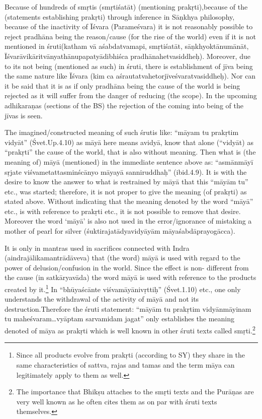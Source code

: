 Because of hundreds of smṛtis (smṛtiśatāt) (mentioning prakṛti),\break because of the (statements establishing prakṛti) through inference in Sāṇkhya philosophy, because of the inactivity of Īśvara (Parameśvara) it is not reasonably possible to reject pradhāna being the reason/cause (for the rise of the world) even if it is not mentioned in śruti(katham vā aśabdatvamapi, smṛtiśatāt, sāṇkhyoktānumānāt, Īśvarāvikāritvānya\-thānupapatyādibhiśca pradhānahetvasiddheḥ). Moreover, due to its not being (mentioned as such) in śruti, there is establishment of jīva being the same nature like Īśvara (kim ca aśrautatvahetorjīveśvaratvasiddheḥ). Nor can it be said that it is as if only pradhāna being the cause of the world is being rejected as it will suffer from the danger of reducing (the scope). In the upcoming adhikaraṇas (sections of the BS) the rejection of the coming into being of the jīvas is seen.

\vskip 5pt

The imagined/constructed meaning of such śrutis like: “māyam tu prakṛtim vidyāt” (Śvet.Up.4.10)  as māyā here means avidyā, know that alone (“vidyāt) as “prakṛti” the cause of the world, that is also without meaning. Then what is (the meaning of) māyā (mentioned) in the immediate sentence above as: “asmānmāyī sṛjate viśvametattasminścānyo māyayā sanniruddhaḥ” (ibid.4.9). It is with the desire to know the answer to what is restrained by māyā that this “māyām tu” etc., was started; therefore, it is not proper to give the meaning (of prakṛti) as stated above. Without indicating that the meaning denoted by the word “māyā” etc., is with reference to prakṛti etc., it is not possible to remove that desire. Moreover the word ‘māyā’ is also not used in the error/ignorance of mistaking a mother of pearl for silver (śuktirajatādyavidyāyām māyaśabdāprayogācca).

\vskip 5pt

It is only in mantras used in sacrifices connected with Indra (aindrajālikamantrādāveva) that (the word) māyā is used with regard to the power of delusion/confusion in the world. Since the effect is non- different from the cause (in satkāryavāda) the word māyā is used with reference to the products created by it.\footnote{Since all products evolve from prakṛti (according to SY) they share in the same characteristics of sattva, rajas and tamas and the  term māya can legitimately apply to them as well.} In “bhūyaścānte viśvamāyānivṛttiḥ” (Śvet.1.10) etc., one only understands the withdrawal of the activity of māyā and not its destruction.Therefore the śruti statement: “māyām tu prakṛtim vidyānmāyinam tu maheśvaram…vyāptam sarvamidam jagat” only establishes the meaning denoted of māya as prakṛti which is well known in other śruti texts called smṛti.\footnote{The importance that Bhikṣu attaches to the smṛti texts and the Purāṇas are very well known as he often cites them as on par with śruti texts themselves.}

